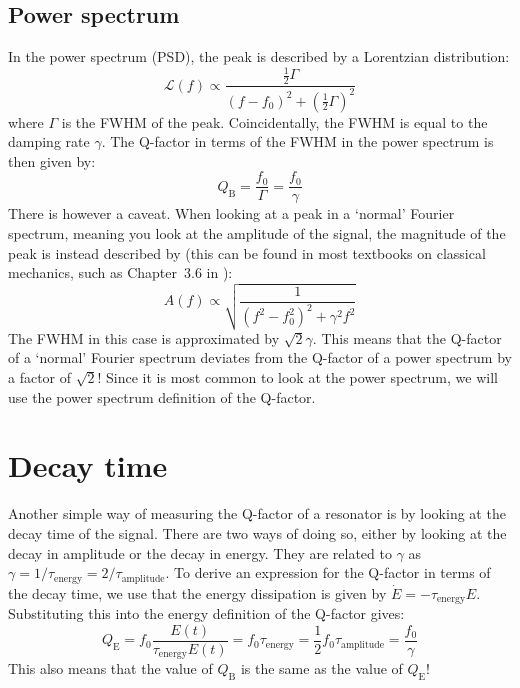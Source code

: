 \subsection{Power spectrum}
In the power spectrum (PSD), the peak is described by a Lorentzian distribution:
\begin{equation}
    \mathcal{L}(f) \propto \frac{\frac{1}{2} \Gamma}{(f - f_0)^2 + \left(\frac{1}{2} \Gamma\right)^2} %
\end{equation}
where $\Gamma$ is the FWHM of the peak. Coincidentally, the FWHM is equal to the damping rate $\gamma$. The Q-factor in terms of the FWHM in the power spectrum is then given by:
\begin{equation}
    Q_\text{B} = \frac{f_0}{\Gamma} = \frac{f_0}{\gamma}
\end{equation}
There is however a caveat. When looking at a peak in a `normal' Fourier spectrum, meaning you look at the amplitude of the signal, the magnitude of the peak is instead described by (this can be found in most textbooks on classical mechanics, such as Chapter~3.6 in \citeauthor{fowles_analytical_2005}):
\begin{equation}
    A(f) \propto \sqrt{\frac{1}{(f^2 - f_0^2)^2 + \gamma^2f^2}}
\end{equation}
The FWHM in this case is approximated by $\sqrt{2}\gamma$. This means that the Q-factor of a `normal' Fourier spectrum deviates from the Q-factor of a power spectrum by a factor of $\sqrt{2}$! Since it is most common to look at the power spectrum, we will use the power spectrum definition of the Q-factor.

\section{Decay time}
Another simple way of measuring the Q-factor of a resonator is by looking at the decay time of the signal. There are two ways of doing so, either by looking at the decay in amplitude or the decay in energy. They are related to $\gamma$ as $\gamma = 1 / \tau_\text{energy} = 2 / \tau_\text{amplitude}$. To derive an expression for the Q-factor in terms of the decay time, we use that the energy dissipation is given by $\dot{E} = -\tau_\text{energy}E$. Substituting this into the energy definition of the Q-factor gives:
\begin{equation}
    Q_\text{E} = f_0 \frac{E(t)}{\tau_\text{energy} E(t)} = f_0 \tau_\text{energy} = \frac{1}{2} f_0 \tau_\text{amplitude} = \frac{f_0}{\gamma}
\end{equation}
This also means that the value of $Q_\text{B}$ is the same as the value of $Q_\text{E}$!

